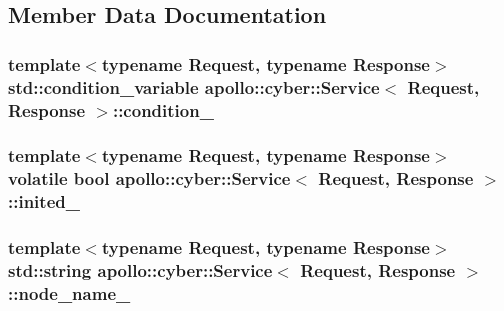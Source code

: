 \subsection{Member Data Documentation}
\hypertarget{classapollo_1_1cyber_1_1Service_af381d15ec5f1288c7ff214fb35362ce4}{
\subsubsection[{condition\-\_\-}]{\setlength{\rightskip}{0pt plus 5cm}template$<$typename Request, typename Response$>$ std\-::condition\-\_\-variable {\bf apollo\-::cyber\-::\-Service}$<$ Request, Response $>$\-::condition\-\_\-\hspace{0.3cm}{\ttfamily [private]}}}\label{classapollo_1_1cyber_1_1Service_af381d15ec5f1288c7ff214fb35362ce4}
\hypertarget{classapollo_1_1cyber_1_1Service_a395a485575e4ef19615d8a1d9ce2ca01}{
\subsubsection[{inited\-\_\-}]{\setlength{\rightskip}{0pt plus 5cm}template$<$typename Request, typename Response$>$ volatile bool {\bf apollo\-::cyber\-::\-Service}$<$ Request, Response $>$\-::inited\-\_\-\hspace{0.3cm}{\ttfamily [private]}}}\label{classapollo_1_1cyber_1_1Service_a395a485575e4ef19615d8a1d9ce2ca01}
\hypertarget{classapollo_1_1cyber_1_1Service_a5d898e348220ba05c2f3997875ba2ec4}{
\subsubsection[{node\-\_\-name\-\_\-}]{\setlength{\rightskip}{0pt plus 5cm}template$<$typename Request, typename Response$>$ std\-::string {\bf apollo\-::cyber\-::\-Service}$<$ Request, Response $>$\-::node\-\_\-name\-\_\-\hspace{0.3cm}{\ttfamily [private]}}}\label{classapollo_1_1cyber_1_1Service_a5d898e348220ba05c2f3997875ba2ec4}
